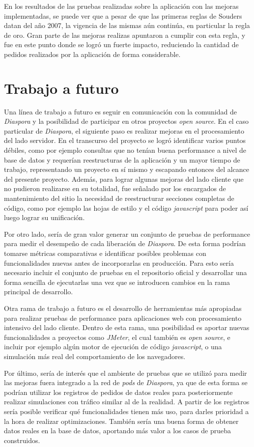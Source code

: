 En los resultados de las pruebas realizadas sobre la aplicación con las mejoras implementadas, se puede ver que a pesar de que las primeras reglas de Souders datan del año 2007, la vigencia
de las mismas aún continúa, en particular la regla de oro. Gran parte de las mejoras realizas apuntaron a cumplir con esta regla, y fue en este punto donde se logró un fuerte impacto, reduciendo la cantidad de pedidos realizados por la aplicación de forma considerable.


\section{Trabajo a futuro}

Una línea de trabajo a futuro es seguir en comunicación con la comunidad de \emph{Diaspora} y la posibilidad de participar en otros proyectos \emph{open source}.
En el caso particular de \emph{Diaspora}, el siguiente paso es realizar mejoras en el procesamiento del lado servidor. En el transcurso del proyecto se logró
identificar varios puntos débiles, como por ejemplo consultas que no tenían buena performance a nivel de base de datos y requerían reestructuras de la aplicación y un mayor tiempo de trabajo, representando un proyecto en sí mismo y escapando entonces del alcance del presente proyecto. Además, para lograr algunas mejoras del lado cliente que no pudieron realizarse en su totalidad, fue señalado por los encargados de mantenimiento del sitio la necesidad de reestructurar secciones completas de código, como por ejemplo las hojas de estilo y el código \emph{javascript} para poder así luego lograr su unificación.

Por otro lado, sería de gran valor generar un conjunto de pruebas de performance para medir el desempeño de cada liberación de \emph{Diaspora}. De esta forma podrían tomarse métricas
comparativas e identificar posibles problemas con funcionalidades nuevas antes de incorporarlas en producción. Para esto sería necesario incluir el conjunto de pruebas en el repositorio oficial y desarrollar una forma sencilla de ejecutarlas
una vez que se introducen cambios en la rama principal de desarrollo.

Otra rama de trabajo a futuro es el desarrollo de herramientas más apropiadas para realizar pruebas de performance para aplicaciones web con procesamiento intensivo del lado cliente.
Dentro de esta rama, una posibilidad es aportar nuevas funcionalidades a proyectos como \emph{JMeter}, el cual también es \emph{open source}, e incluir por ejemplo algún
motor de ejecución de código \emph{javascript}, o una simulación más real del comportamiento de los navegadores.

Por último, sería de interés que el ambiente de pruebas que se utilizó para medir las mejoras fuera integrado a la red de \emph{pods} de \emph{Diaspora}, ya que de esta forma se podrían utilizar los registros de pedidos
de datos reales para posteriormente realizar simulaciones con tráfico similar al de la realidad. A partir de los registros sería posible verificar qué funcionalidades tienen más uso, para 
darles prioridad a la hora de realizar optimizaciones. También sería una buena forma de obtener datos reales en la base de datos, aportando más valor a los casos de prueba 
construidos.
